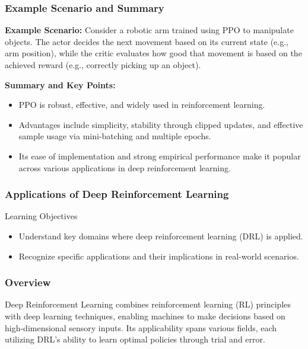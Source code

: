 \documentclass[aspectratio=169]{beamer}
\begin{document}
\begin{frame}[fragile]
  \frametitle{Example Scenario and Summary}
  
  \textbf{Example Scenario:} 
  Consider a robotic arm trained using PPO to manipulate objects. The actor decides the next movement based on its current state (e.g., arm position), while the critic evaluates how good that movement is based on the achieved reward (e.g., correctly picking up an object). 

  \bigskip
  
  \textbf{Summary and Key Points:} 
  \begin{itemize}
    \item PPO is robust, effective, and widely used in reinforcement learning.
    \item Advantages include simplicity, stability through clipped updates, and effective sample usage via mini-batching and multiple epochs.
    \item Its ease of implementation and strong empirical performance make it popular across various applications in deep reinforcement learning.
  \end{itemize}
\end{frame}

\begin{frame}[fragile]
    \frametitle{Applications of Deep Reinforcement Learning}
    \begin{block}{Learning Objectives}
        \begin{itemize}
            \item Understand key domains where deep reinforcement learning (DRL) is applied.
            \item Recognize specific applications and their implications in real-world scenarios.
        \end{itemize}
    \end{block}
\end{frame}

\begin{frame}[fragile]
    \frametitle{Overview}
    Deep Reinforcement Learning combines reinforcement learning (RL) principles with deep learning techniques, 
    enabling machines to make decisions based on high-dimensional sensory inputs. Its applicability spans various fields, 
    each utilizing DRL's ability to learn optimal policies through trial and error.
\end{frame}
\end{document}

